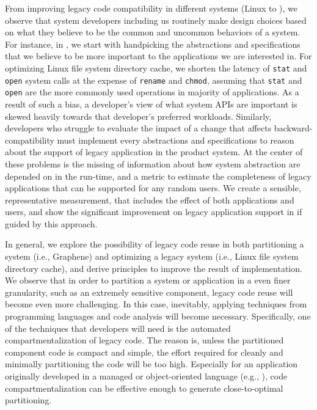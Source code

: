 From improving legacy code compatibility in different systems
(Linux to \graphene{}),
we observe that system developers including us
routinely make design choices based on 
what they believe to be the common and uncommon behaviors of a system.
For instance, in \graphene{}, we start with handpicking the abstractions and specifications
that we believe to be more important to the applications we are interested in.
For optimizing Linux file system directory cache,
we shorten the latency of {\tt stat} and {\tt open} system calls
at the expense of {\tt rename} and {\tt chmod},
assuming that {\tt stat} and {\tt open} are the more commonly used operations in majority of applications.
As a result of such a bias,
a developer's view of what system APIs are important
is skewed heavily towards that developer's preferred workloads.
Similarly, developers who struggle to evaluate the impact of a 
change that affects backward-compatibility
must implement every abstractions and specifications to reason about the support of legacy application in the product system.
At the center of these problems is the missing of information about how system abstraction are depended on in the run-time,
and a metric to estimate the completeness of legacy applications that can be supported
for any random users.
We create a sensible, representative measurement, that includes the effect of both applications and users,
and show the significant improvement on legacy application support in \graphene{}
if guided by this approach.


In general, we explore the possibility of legacy code reuse in both
partitioning a system
(i.e., Graphene) and
optimizing a legacy system
(i.e., Linux file system directory cache),
and derive principles to improve the result of implementation.
We observe that in order to partition a system or application
in a even finer granularity,
such as an extremely sensitive component,
legacy code reuse will become even more challenging.
In this case,
inevitably, applying techniques from programming languages and code analysis
will become necessary.
Specifically, one of the techniques that developers will need is the automated compartmentalization of legacy code.
The reason is, 
unless the partitioned component code is compact and simple,
the effort required
for cleanly and minimally partitioning the code
will be too high.
Especially for an application originally developed in a managed or object-oriented language (e.g., \java{}),
code compartmentalization can be effective enough to generate close-to-optimal partitioning.

